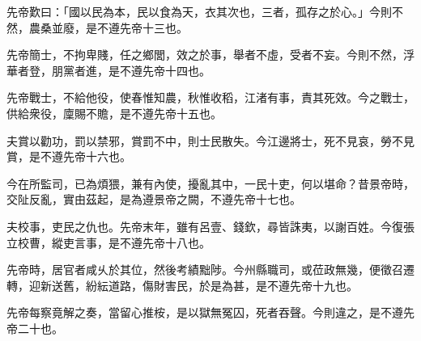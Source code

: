 \begin{pinyinscope}
先帝歎曰：「國以民為本，民以食為天，衣其次也，三者，孤存之於心。」今則不然，農桑並廢，是不遵先帝十三也。

先帝簡士，不拘卑賤，任之鄉閭，效之於事，舉者不虛，受者不妄。今則不然，浮華者登，朋黨者進，是不遵先帝十四也。

先帝戰士，不給他役，使春惟知農，秋惟收稻，江渚有事，責其死效。今之戰士，供給衆役，廩賜不贍，是不遵先帝十五也。

夫賞以勸功，罰以禁邪，賞罰不中，則士民散失。今江邊將士，死不見哀，勞不見賞，是不遵先帝十六也。

今在所監司，已為煩猥，兼有內使，擾亂其中，一民十吏，何以堪命？昔景帝時，交阯反亂，實由茲起，是為遵景帝之闕，不遵先帝十七也。

夫校事，吏民之仇也。先帝末年，雖有呂壹、錢欽，尋皆誅夷，以謝百姓。今復張立校曹，縱吏言事，是不遵先帝十八也。

先帝時，居官者咸乆於其位，然後考績黜陟。今州縣職司，或莅政無幾，便徵召遷轉，迎新送舊，紛紜道路，傷財害民，於是為甚，是不遵先帝十九也。

先帝每察竟解之奏，當留心推桉，是以獄無冤囚，死者吞聲。今則違之，是不遵先帝二十也。


\end{pinyinscope}

